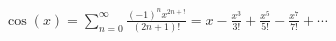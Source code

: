 \documentclass[preview]{standalone}
\begin{document}
\begin{align*}
\cos(x) = \sum_{n=0}^{\infty} \frac{(-1)^n x^{2n+!}}{(2n+1)!} = x-\frac{x^3}{3!}+\frac{x^5}{5!}-\frac{x^7}{7!}+\cdots
\end{align*}
\end{document}
